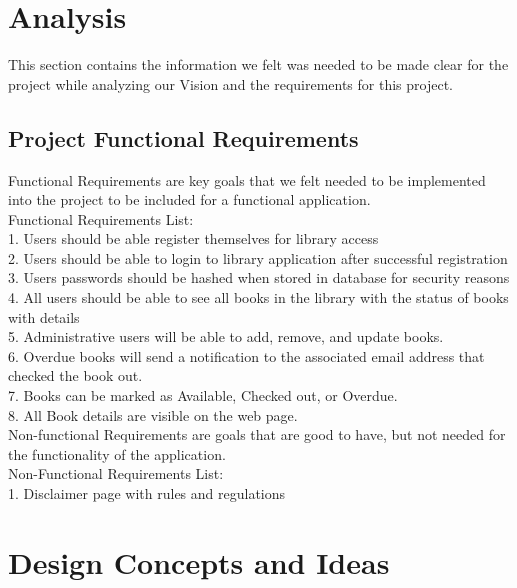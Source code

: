 \documentclass{article}
\begin{document}
	\section{Analysis}
	
	This section contains the information we felt was needed to be made clear for the project while analyzing our Vision and the requirements for this project.
	
	\subsection{Project Functional Requirements}
	
	Functional Requirements are key goals that we felt needed to be implemented into the project to be included for a functional application. \\
	
	Functional Requirements List:\\
	1. Users should be able register themselves for library access \\
	2. Users should be able to login to library application after successful registration \\
	3. Users passwords should be hashed when stored in database for security reasons \\
	4. All users should be able to see all books in the library with the status of books with details \\
	5. Administrative users will be able to add, remove, and update books. \\
	6. Overdue books will send a notification to the associated email address that checked the book out. \\
	7. Books can be marked as Available, Checked out, or Overdue. \\
	8. All Book details are visible on the web page. \\
	
	Non-functional Requirements are goals that are good to have, but not needed for the functionality of the application. \\
	
	Non-Functional Requirements List: \\
	1. Disclaimer page with rules and regulations \\
	
	\section{Design Concepts and Ideas}
	
\end{document}

